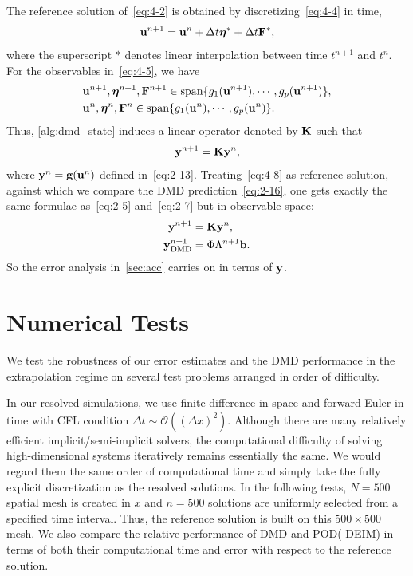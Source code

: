 \documentclass[10pt]{article}
\numberwithin{equation}{section}
\theoremstyle{plain}
\theoremstyle{remark}
\theoremstyle{remark}
\begin{document}
The reference solution of~\cref{eq:4-2} is obtained by discretizing~\cref{eq:4-4} in time,
\begin{equation}\label{eq:4-6}
\bold u^{n+1} =\bold u^n+\Delta t\boldsymbol \eta^*+\Delta t\bold F^*,
\end{equation}
where the superscript $*$ denotes linear interpolation between time $t^{n+1}$ and $t^n$. For the observables in~\cref{eq:4-5}, we have
\begin{equation}\label{eq:4-7}
\begin{aligned}
&\bold u^{n+1}, \boldsymbol \eta^{n+1}, \bold F^{n+1} \in \text{span} \{g_1(\bold u^{n+1}), \cdots, g_p(\bold u^{n+1})\},\\
&\bold u^{n}, \boldsymbol \eta^{n}, \bold F^{n} \in \text{span} \{g_1(\bold u^{n}), \cdots, g_p(\bold u^{n})\}.
\end{aligned}
\end{equation}
Thus, \cref{alg:dmd_state} induces a linear operator denoted by $\bold K$ such that
\begin{equation}\label{eq:4-8}
\bold y^{n+1} =\bold K \bold y^n,
\end{equation}
where $\bold y^n =\bold g(\bold u^n)$ defined in~\cref{eq:2-13}. Treating~\cref{eq:4-8} as reference solution, against which we compare the DMD prediction~\cref{eq:2-16}, one gets exactly the same formulae as~\cref{eq:2-5} and~\cref{eq:2-7} but in observable space:
\begin{equation}\label{eq:4-9}
\begin{aligned}
\bold y^{n+1} = & \; \bold K\bold y^n,\\
\bold y_\text{DMD}^{n+1} = & \; \Phi \Lambda^{n+1}\bold b.
\end{aligned}
\end{equation}
So the error analysis in~\cref{sec:acc} carries on in terms of $\bold y$.

\section{Numerical Tests}
\label{sec:tests}

We test the robustness of our error estimates and the DMD performance in the extrapolation regime on several test problems arranged in order of difficulty.

In our resolved simulations, we use finite difference in space and forward Euler in time with CFL condition $\Delta t\sim \mathcal O((\Delta x)^2)$. Although there are many relatively efficient implicit/semi-implicit solvers, the computational difficulty of solving high-dimensional systems iteratively remains essentially the same. We would regard them the same order of computational time and simply take the fully explicit discretization as the resolved solutions. In the following tests, $N=500$ spatial mesh is created in $x$ and $n=500$ solutions are uniformly selected from a specified time interval. Thus, the reference solution is built on this $500\times 500$ mesh. We also compare the relative performance of DMD and POD(-DEIM) in terms of both their computational time and error with respect to the reference solution.
\end{document}
